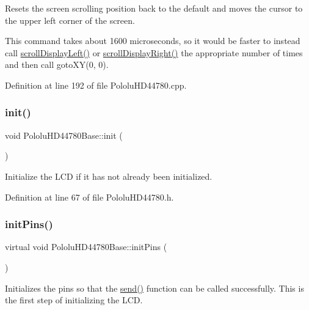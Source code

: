 Resets the screen scrolling position back to the default and moves the cursor to the upper left corner of the screen.

This command takes about 1600 microseconds, so it would be faster to instead call \hyperlink{class_pololu_h_d44780_base_aada34a47663585f60b70e1d6f936f6d3}{scroll\+Display\+Left()} or \hyperlink{class_pololu_h_d44780_base_a411512707f303af75de3c5aea313bf48}{scroll\+Display\+Right()} the appropriate number of times and then call goto\+X\+Y(0, 0). 

Definition at line 192 of file Pololu\+H\+D44780.\+cpp.

\mbox{\label{class_pololu_h_d44780_base_a1c2a3edc8cfecde7e6fd2a83c17c0e23}} 
\subsubsection{\texorpdfstring{init()}{init()}}
{\footnotesize\ttfamily void Pololu\+H\+D44780\+Base\+::init (\begin{DoxyParamCaption}{ }\end{DoxyParamCaption})\hspace{0.3cm}{\ttfamily [inline]}}

Initialize the L\+CD if it has not already been initialized. 

Definition at line 67 of file Pololu\+H\+D44780.\+h.

\mbox{\label{class_pololu_h_d44780_base_a9c2a2e0dfb089a6c21aa12a6a5299750}} 
\subsubsection{\texorpdfstring{init\+Pins()}{initPins()}}
{\footnotesize\ttfamily virtual void Pololu\+H\+D44780\+Base\+::init\+Pins (\begin{DoxyParamCaption}{ }\end{DoxyParamCaption})\hspace{0.3cm}{\ttfamily [pure virtual]}}

Initializes the pins so that the \hyperlink{class_pololu_h_d44780_base_a004d5adb9e7c3cc546c6b0ed427dec7b}{send()} function can be called successfully. This is the first step of initializing the L\+CD. 

